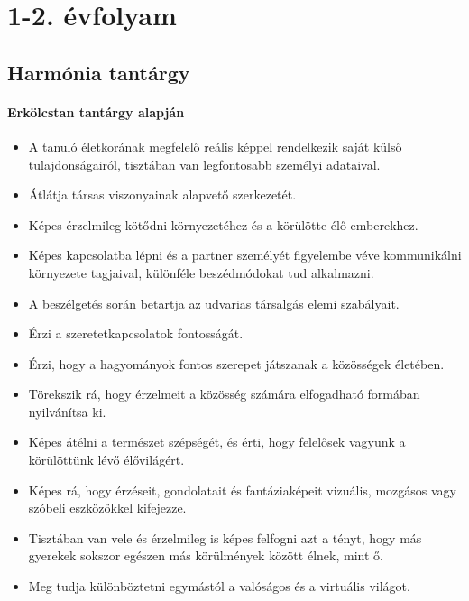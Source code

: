 \section{1-2. évfolyam}
\subsection{Harmónia tantárgy}
\paragraph{Erkölcstan tantárgy alapján}
\begin{itemize}
\item A tanuló életkorának megfelelő reális képpel rendelkezik saját külső tulajdonságairól, tisztában van legfontosabb személyi adataival.
\item Átlátja társas viszonyainak alapvető szerkezetét.
\item Képes érzelmileg kötődni környezetéhez és a körülötte élő emberekhez.
\item Képes kapcsolatba lépni és a partner személyét figyelembe véve kommunikálni környezete tagjaival, különféle beszédmódokat tud alkalmazni.
\item A beszélgetés során betartja az udvarias társalgás elemi szabályait.
\item Érzi a szeretetkapcsolatok fontosságát.
\item Érzi, hogy a hagyományok fontos szerepet játszanak a közösségek életében.
\item Törekszik rá, hogy érzelmeit a közösség számára elfogadható formában nyilvánítsa ki.
\item Képes átélni a természet szépségét, és érti, hogy felelősek vagyunk a körülöttünk lévő élővilágért.
\item Képes rá, hogy érzéseit, gondolatait és fantáziaképeit vizuális, mozgásos vagy szóbeli eszközökkel kifejezze.
\item Tisztában van vele és érzelmileg is képes felfogni azt a tényt, hogy más gyerekek sokszor egészen más körülmények között élnek, mint ő.
\item Meg tudja különböztetni egymástól a valóságos és a virtuális világot.
\end{itemize}
